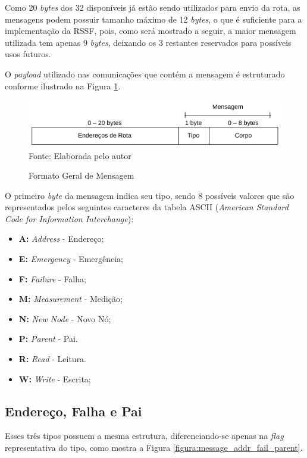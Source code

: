 {Como 20 \textit{bytes} dos 32 disponíveis já estão sendo utilizados para envio da rota, as mensagens podem
possuir tamanho máximo de 12 \textit{bytes}, o que é suficiente para a implementação da RSSF, pois, como será
mostrado a seguir, a maior mensagem utilizada tem apenas 9 \textit{bytes}, deixando os 3 restantes reservados
para possíveis usos futuros.

O \textit{payload} utilizado nas comunicações que contém a mensagem é estruturado conforme ilustrado na Figura
\ref{figura:message_types}.

\begin{figure}[h!]
	\caption{Formato Geral de Mensagem}
	\centering
	\includegraphics[scale=0.5]{../images/mensagem_tipos.png}
	\hspace{\linewidth}
	Fonte: Elaborada pelo autor
	\label{figura:message_types}
\end{figure}

O primeiro \textit{byte} da mensagem indica seu tipo, sendo 8 possíveis valores que são representados pelos
seguintes caracteres da tabela ASCII (\textit{American Standard Code for Information Interchange}):

\begin{itemize}
	\item \textbf{A:} \textit{Address} - Endereço;
	\item \textbf{E:} \textit{Emergency} - Emergência;
	\item \textbf{F:} \textit{Failure} - Falha;
	\item \textbf{M:} \textit{Measurement} - Medição;
	\item \textbf{N:} \textit{New Node} - Novo Nó;
	\item \textbf{P:} \textit{Parent} - Pai.
	\item \textbf{R:} \textit{Read} - Leitura.
	\item \textbf{W:} \textit{Write} - Escrita;
\end{itemize}

\subsection{Endereço, Falha e Pai}
Esses três tipos possuem a mesma estrutura, diferenciando-se apenas na \textit{flag} representativa do tipo,
como mostra a Figura \ref{figura:message_addr_fail_parent}.

}
